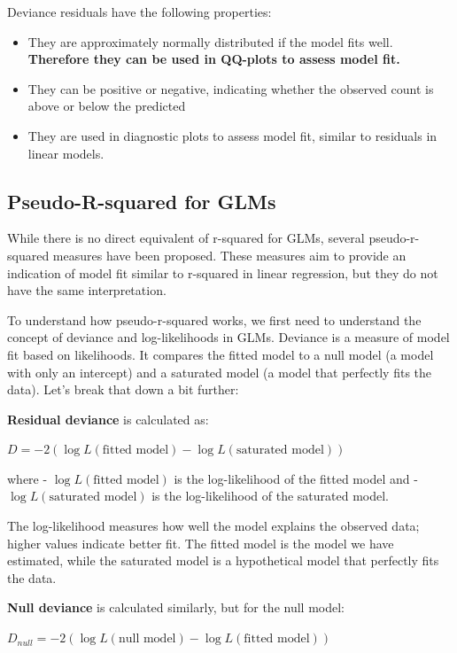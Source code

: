 \documentclass[
  letterpaper,
  8pt,
  a4paper]{book}
\providecommand{\tightlist}{%
  \setlength{\itemsep}{0pt}\setlength{\parskip}{0pt}}
\begin{document}
Deviance residuals have the following properties:

\begin{itemize}
\tightlist
\item
  They are approximately normally distributed if the model fits well.
  \textbf{Therefore they can be used in QQ-plots to assess model fit.}
\item
  They can be positive or negative, indicating whether the observed
  count is above or below the predicted
\item
  They are used in diagnostic plots to assess model fit, similar to
  residuals in linear models.
\end{itemize}

\subsection*{Pseudo-R-squared for GLMs}\label{pseudo-r-squared-for-glms}

While there is no direct equivalent of r-squared for GLMs, several
pseudo-r-squared measures have been proposed. These measures aim to
provide an indication of model fit similar to r-squared in linear
regression, but they do not have the same interpretation.

To understand how pseudo-r-squared works, we first need to understand
the concept of deviance and log-likelihoods in GLMs. Deviance is a
measure of model fit based on likelihoods. It compares the fitted model
to a null model (a model with only an intercept) and a saturated model
(a model that perfectly fits the data). Let's break that down a bit
further:

\textbf{Residual deviance} is calculated as:

\(D = -2 \left( \log L(\text{fitted model}) - \log L(\text{saturated model}) \right)\)

where - \(\log L(\text{fitted model})\) is the log-likelihood of the
fitted model and - \(\log L(\text{saturated model})\) is the
log-likelihood of the saturated model.

The log-likelihood measures how well the model explains the observed
data; higher values indicate better fit. The fitted model is the model
we have estimated, while the saturated model is a hypothetical model
that perfectly fits the data.

\textbf{Null deviance} is calculated similarly, but for the null model:

\(D_{null} = -2 \left( \log L(\text{null model}) - \log L(\text{fitted model}) \right)\)
\end{document}
